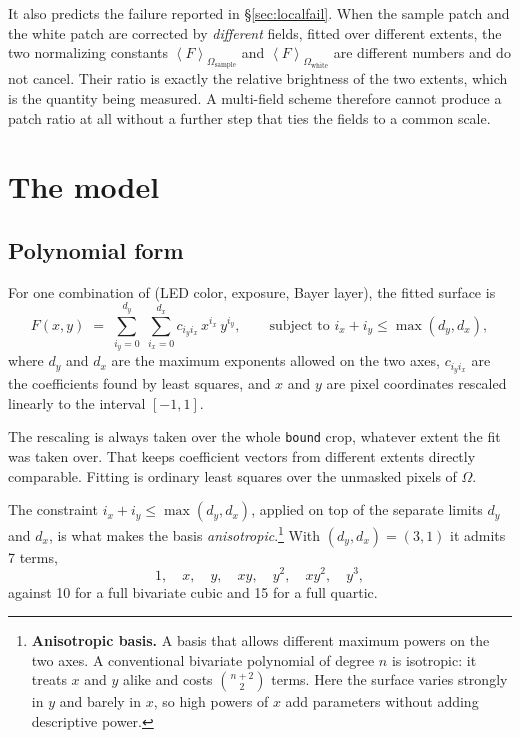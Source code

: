 \documentclass[11pt, a4paper]{article}
\newcommand{\code}[1]{\texttt{#1}}
\newcommand{\mean}[2]{\left\langle #1 \right\rangle_{#2}}
\begin{document}
It also predicts the failure reported in \S\ref{sec:localfail}.
When the sample patch and the white patch are corrected by
\emph{different} fields,
fitted over different extents,
the two normalizing constants $\mean{F}{\Omega_{\mathrm{sample}}}$
and $\mean{F}{\Omega_{\mathrm{white}}}$ are different numbers
and do not cancel.
Their ratio is exactly the relative brightness of the two extents,
which is the quantity being measured.
A multi-field scheme therefore cannot produce a patch ratio at all
without a further step that ties the fields to a common scale.

\section{The model}
\label{sec:model}

\subsection{Polynomial form}

For one combination of (LED color, exposure, Bayer layer),
the fitted surface is
\begin{equation}
  F(x,y) \;=\;
  \sum_{i_y=0}^{d_y} \; \sum_{i_x=0}^{d_x}
  c_{i_y i_x}\, x^{i_x}\, y^{i_y},
  \qquad
  \text{subject to } i_x + i_y \le \max(d_y, d_x),
  \label{eq:poly}
\end{equation}
where $d_y$ and $d_x$ are the maximum exponents allowed on the two axes,
$c_{i_y i_x}$ are the coefficients found by least squares,
and $x$ and $y$ are pixel coordinates rescaled linearly to the interval
$[-1,1]$.

The rescaling is always taken over the whole \code{bound} crop,
whatever extent the fit was taken over.
That keeps coefficient vectors from different extents directly comparable.
Fitting is ordinary least squares over the unmasked pixels of $\Omega$.

The constraint $i_x + i_y \le \max(d_y,d_x)$,
applied on top of the separate limits $d_y$ and $d_x$,
is what makes the basis \emph{anisotropic}.\footnote{\textbf{Anisotropic
basis.}
A basis that allows different maximum powers on the two axes.
A conventional bivariate polynomial of degree $n$ is isotropic:
it treats $x$ and $y$ alike and costs $\binom{n+2}{2}$ terms.
Here the surface varies strongly in $y$ and barely in $x$,
so high powers of $x$ add parameters without adding descriptive power.}
With $(d_y,d_x) = (3,1)$ it admits 7 terms,
\[
  1,\quad x,\quad y,\quad xy,\quad y^{2},\quad xy^{2},\quad y^{3},
\]
against 10 for a full bivariate cubic and 15 for a full quartic.
\end{document}
